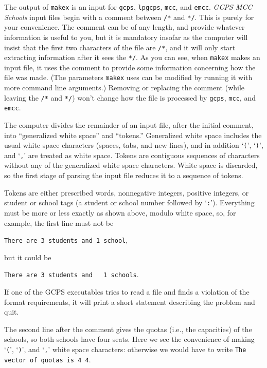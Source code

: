 \documentclass[12pt]{article}
\theoremstyle{definition}
\begin{document}
\medskip

The output of \texttt{makex} is an input for \texttt{gcps},
\texttt{lpgcps}, \texttt{mcc}, and \texttt{emcc}.  \emph{GCPS MCC
Schools} input files begin with a comment between \texttt{/*} and
\texttt{*/}.  This is purely for your convenience.  The comment can be
of any length, and provide whatever information is useful to you, but
it is mandatory insofar as the computer will insist that the first two
characters of the file are \texttt{/*}, and it will only start
extracting information after it sees the \texttt{*/}.  As you can see,
when \texttt{makex} makes an input file, it uses the comment to
provide some information concerning how the file was made.  (The
parameters \texttt{makex} uses can be modified by running it with more
command line arguments.)  Removing or replacing the comment (while
leaving the \texttt{/*} and \texttt{*/}) won't change how the file is
processed by \texttt{gcps}, \texttt{mcc}, and \texttt{emcc}.

The computer divides the remainder of an input file, after the initial
comment, into ``generalized white space'' and ``tokens.''  Generalized
white space includes the usual white space characters (spaces, tabs,
and new lines), and in addition `\texttt{(}', `\texttt{)}', and
`\texttt{,}' are treated as white space.  Tokens are contiguous
sequences of characters without any of the generalized white space
characters.  White space is discarded, so the first stage of parsing
the input file reduces it to a sequence of tokens.

Tokens are either prescribed words, nonnegative integers, positive
integers, or student or school tags (a student or school number
followed by `\texttt{:}').  Everything must be more or less exactly as
shown above, modulo white space, so, for example, the first line must
not be

\texttt{There are 3 students and 1 school},

\noindent
but it could be

\texttt{There are 3 students and \ \ 1 schools}.

\noindent
If one of the GCPS executables tries to read a file and finds a
violation of the format requirements, it will print a short statement
describing the problem and quit.

The second line after the comment gives the quotas (i.e., the
capacities) of the schools, so both schools have four seats.
Here we see the convenience of making `\texttt{(}', `\texttt{)}', and
`\texttt{,}' white space characters: otherwise we would have to write
\texttt{The vector of quotas is 4 4}.
\end{document}
